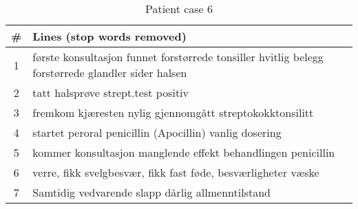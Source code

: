 \begin{table}[htbp] \footnotesize \center
\caption{Patient case 6\label{tab:pcase6}}
\begin{tabularx}{\textwidth}{c X}
    \toprule
    \# & Lines (stop words removed) \\
    \midrule
	1 & første konsultasjon funnet forstørrede tonsiller hvitlig belegg forstørrede glandler sider halsen \\
	2 & tatt halsprøve strept.test positiv \\
	3 & fremkom kjæresten nylig gjennomgått streptokokktonsilitt \\
	4 & startet peroral penicillin (Apocillin) vanlig dosering \\
	5 & kommer konsultasjon manglende effekt behandlingen penicillin \\
	6 & verre, fikk svelgbesvær, fikk fast føde, besværligheter væske \\
	7 & Samtidig vedvarende slapp dårlig allmenntilstand \\
	\bottomrule
\end{tabularx}
\end{table}


